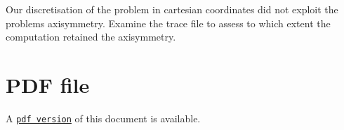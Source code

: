 \begin{DoxyEnumerate}
\item Our discretisation of the problem in cartesian coordinates did not exploit the problem\textquotesingle{}s axisymmetry. Examine the trace file to assess to which extent the computation retained the axisymmetry. ~\newline
~\newline

\end{DoxyEnumerate}



 

 \hypertarget{index_pdf}{}\section{P\+D\+F file}\label{index_pdf}
A \href{../latex/refman.pdf}{\tt pdf version} of this document is available. 
